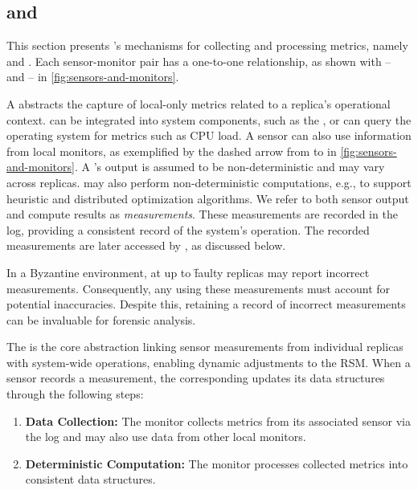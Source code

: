 \subsection{\Sensors and \Monapps}
\label{sec:sm}

This section presents \sysname's mechanisms for collecting and processing metrics, namely \sensors and \monitors.
Each sensor-monitor pair has a one-to-one relationship, as shown with -- and -- in \cref{fig:sensors-and-monitors}.

A \textit{\sensor} abstracts the capture of local-only metrics related to a replica's operational context.
\Sensors can be integrated into system components, such as the \consmod, or can query the operating system for metrics such as CPU load.
A sensor can also use information from local monitors, as exemplified by the dashed arrow from  to  in \cref{fig:sensors-and-monitors}.
A \sensor's output is assumed to be non-deterministic and may vary across replicas.
\Sensors may also perform non-deterministic computations, e.g., to support heuristic and distributed optimization algorithms.
We refer to both sensor output and compute results as \textit{measurements}.
These measurements are recorded in the log, providing a consistent record of the system's operation.
The recorded measurements are later accessed by \monitors, as discussed below.

In a Byzantine environment, \sensors at up to \f faulty replicas may report incorrect measurements.
Consequently, any \monitor using these measurements must account for potential inaccuracies.
Despite this, retaining a record of incorrect measurements can be invaluable for forensic analysis.

The \textit{\monitor} is the core abstraction linking sensor measurements from individual replicas with system-wide operations, enabling dynamic adjustments to the RSM.
When a sensor records a measurement, the corresponding \monitor updates its data structures through the following steps:

\begin{enumerate}
  \item \textbf{Data Collection:}
    The monitor collects metrics from its associated sensor via the log and may also use data from other local monitors.
  \item \textbf{Deterministic Computation:}
    The monitor processes collected metrics into consistent data structures.
\end{enumerate}

